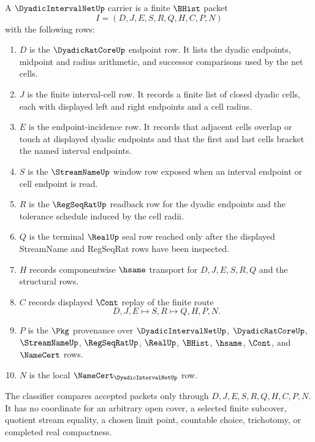 \begin{definition}\label{def:dyadic-interval-net-carrier}
A $\DyadicIntervalNetUp$ carrier is a finite $\BHist$ packet
$$
I=(D,J,E,S,R,Q,H,C,P,N)
$$
with the following rows:
\begin{enumerate}
\item $D$ is the $\DyadicRatCoreUp$ endpoint row. It lists the dyadic endpoints, midpoint and radius arithmetic, and successor comparisons used by the net cells.
\item $J$ is the finite interval-cell row. It records a finite list of closed dyadic cells, each with displayed left and right endpoints and a cell radius.
\item $E$ is the endpoint-incidence row. It records that adjacent cells overlap or touch at displayed dyadic endpoints and that the first and last cells bracket the named interval endpoints.
\item $S$ is the $\StreamNameUp$ window row exposed when an interval endpoint or cell endpoint is read.
\item $R$ is the $\RegSeqRatUp$ readback row for the dyadic endpoints and the tolerance schedule induced by the cell radii.
\item $Q$ is the terminal $\RealUp$ seal row reached only after the displayed StreamName and RegSeqRat rows have been inspected.
\item $H$ records componentwise $\hsame$ transport for $D,J,E,S,R,Q$ and the structural rows.
\item $C$ records displayed $\Cont$ replay of the finite route
$$
D,J,E \longmapsto S,R \longmapsto Q,H,P,N .
$$
\item $P$ is the $\Pkg$ provenance over $\DyadicIntervalNetUp$, $\DyadicRatCoreUp$, $\StreamNameUp$, $\RegSeqRatUp$, $\RealUp$, $\BHist$, $\hsame$, $\Cont$, and $\NameCert$ rows.
\item $N$ is the local $\NameCert_{\DyadicIntervalNetUp}$ row.
\end{enumerate}
The classifier compares accepted packets only through $D,J,E,S,R,Q,H,C,P,N$. It has no coordinate for an arbitrary open cover, a selected finite subcover, quotient stream equality, a chosen limit point, countable choice, trichotomy, or completed real compactness.
\end{definition}

